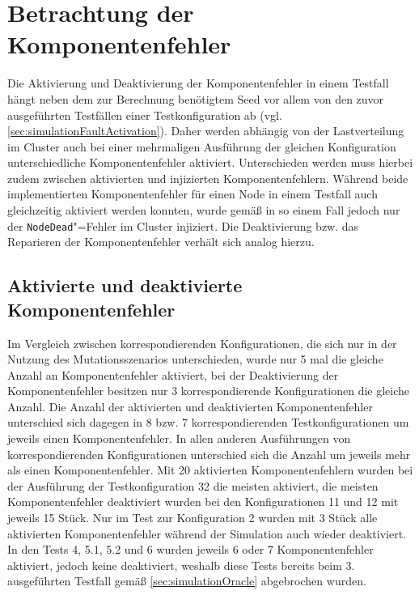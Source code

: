 \section{Betrachtung der Komponentenfehler}
\label{sec:faultEval}

Die Aktivierung und Deaktivierung der Komponentenfehler in einem Testfall hängt neben dem zur Berechnung benötigtem Seed vor allem von den zuvor ausgeführten Testfällen einer Testkonfiguration ab (vgl. \autoref{sec:simulationFaultActivation}).
Daher werden abhängig von der Lastverteilung im Cluster auch bei einer mehrmaligen Ausführung der gleichen Konfiguration \uU unterschiedliche Komponentenfehler aktiviert.
Unterschieden werden muss hierbei zudem zwischen aktivierten und injizierten Komponentenfehlern.
Während beide implementierten Komponentenfehler für einen Node in einem Testfall auch gleichzeitig aktiviert werden konnten, wurde gemäß  in so einem Fall jedoch nur der \texttt{NodeDead}"=Fehler im Cluster injiziert.
Die Deaktivierung bzw. das Reparieren der Komponentenfehler verhält sich analog hierzu.

\subsection{Aktivierte und deaktivierte Komponentenfehler}
\label{sec:actDeactFaults}

Im Vergleich zwischen korrespondierenden Konfigurationen, die sich nur in der Nutzung des Mutationsszenarios unterschieden, wurde nur 5 mal die gleiche Anzahl an Komponentenfehler aktiviert, bei der Deaktivierung der Komponentenfehler besitzen nur 3 korrespondierende Konfigurationen die gleiche Anzahl.
Die Anzahl der aktivierten und deaktivierten Komponentenfehler unterschied sich dagegen in 8 bzw. 7 korrespondierenden Testkonfigurationen um jeweils einen Komponentenfehler.
In allen anderen Ausführungen von korrespondierenden Konfigurationen unterschied sich die Anzahl um jeweils mehr als einen Komponentenfehler.
Mit 20 aktivierten Komponentenfehlern wurden bei der Ausführung der Testkonfiguration 32 die meisten aktiviert, die meisten Komponentenfehler deaktiviert wurden bei den Konfigurationen 11 und 12 mit jeweils 15 Stück.
Nur im Test zur Konfiguration 2 wurden mit 3 Stück alle aktivierten Komponentenfehler während der Simulation auch wieder deaktiviert.
In den Tests 4, 5.1, 5.2 und 6 wurden jeweils 6 oder 7 Komponentenfehler aktiviert, jedoch keine deaktiviert, weshalb diese Tests bereits beim 3. ausgeführten Testfall gemäß \autoref{sec:simulationOracle} abgebrochen wurden.

